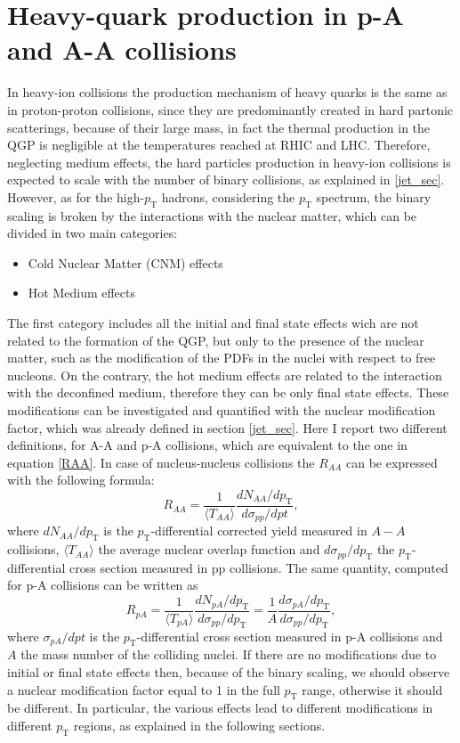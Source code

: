 \documentclass[b5paper,10pt,twoside,oldstyle,classica]{toptesi}
\newcommand{\pt}{p_\text{T}}
\begin{document}
\section{Heavy-quark production in p-A and A-A collisions}
In heavy-ion collisions the production mechanism of heavy quarks is the same as in proton-proton collisions, since they are predominantly created in hard partonic scatterings, because of their large mass, in fact the thermal production in the QGP is negligible at the temperatures reached at RHIC and LHC. Therefore, neglecting medium effects, the hard particles production in heavy-ion collisions is expected to scale with the number of binary collisions, as explained in \ref{jet_sec}.
However, as for the high-$\pt$ hadrons, considering the $\pt$ spectrum, the binary scaling is broken by the interactions with the nuclear matter, which can be divided in two main categories:
\begin{itemize}
 \item Cold Nuclear Matter (CNM) effects 
 \item Hot Medium effects
\end{itemize}
The first category includes all the initial and final state effects wich are not related to the formation of the QGP, but only to the presence of the nuclear matter, such as the modification of the PDFs in the nuclei with respect to free nucleons. On the contrary, the hot medium effects are related to the interaction with the deconfined medium, therefore they can be only final state effects. 
These modifications can be investigated and quantified with the nuclear modification factor, which was already defined in section \ref{jet_sec}. Here I report two different definitions, for A-A and p-A collisions, which are equivalent to the one in equation \ref{RAA}.
In case of nucleus-nucleus collisions the $R_{AA}$ can be expressed with the following formula: 
\begin{equation}
 R_{AA} = \frac{1}{\langle T_{AA} \rangle} \frac{dN_{AA}/d\pt}{d\sigma_{pp}/dpt},
 \label{RAA_HF}
\end{equation}
where $dN_{AA}/d\pt$ is the $\pt$-differential corrected yield measured in $A-A$ collisions, $\langle T_{AA} \rangle$ the average nuclear overlap function and $d\sigma_{pp}/d\pt$ the $\pt$-differential cross section measured in pp collisions. The same quantity, computed for p-A collisions can be written as
\begin{equation}
 R_{pA} = \frac{1}{\langle T_{pA} \rangle} \frac{dN_{pA}/d\pt}{d\sigma_{pp}/d\pt} = \frac{1}{A} \frac{d\sigma_{pA}/d\pt}{d\sigma_{pp}/d\pt},
 \label{RpA_HF}
\end{equation}
where $\sigma_{pA}/dpt$ is the $\pt$-differential cross section measured in p-A collisions and $A$ the mass number of the colliding nuclei. If there are no modifications due to initial or final state effects then, because of the binary scaling, we should observe a nuclear modification factor equal to 1 in the full $\pt$ range, otherwise it should be different. In particular, the various effects lead to different modifications in different $\pt$ regions, as explained in the following sections.
\end{document}
